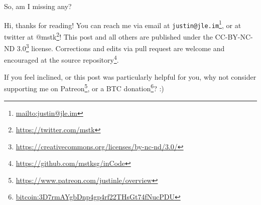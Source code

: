 \documentclass[]{article}
\renewcommand{\href}[2]{#2\footnote{\url{#1}}}
\begin{document}
So, am I missing any?

Hi, thanks for reading! You can reach me via email at
\href{mailto:justin@jle.im}{\nolinkurl{justin@jle.im}}, or at twitter at
\href{https://twitter.com/mstk}{@mstk}! This post and all others are published
under the \href{https://creativecommons.org/licenses/by-nc-nd/3.0/}{CC-BY-NC-ND
3.0} license. Corrections and edits via pull request are welcome and encouraged
at \href{https://github.com/mstksg/inCode}{the source repository}.

If you feel inclined, or this post was particularly helpful for you, why not
consider \href{https://www.patreon.com/justinle/overview}{supporting me on
Patreon}, or a \href{bitcoin:3D7rmAYgbDnp4gp4rf22THsGt74fNucPDU}{BTC donation}?
:)
\end{document}
